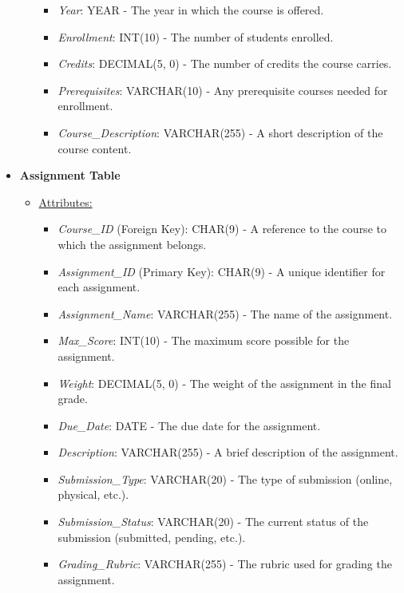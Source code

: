 \documentclass[12pt]{article}
\begin{document}
\begin{itemize}
\begin{itemize}
\begin{itemize}
            \item \textit{Year}: YEAR - The year in which the course is offered.
            \item \textit{Enrollment}: INT(10) - The number of students enrolled.
            \item \textit{Credits}: DECIMAL(5, 0) - The number of credits the course carries.
            \item \textit{Prerequisites}: VARCHAR(10) - Any prerequisite courses needed for enrollment.
            \item \textit{Course\_Description}: VARCHAR(255) - A short description of the course content.
        \end{itemize}
    \end{itemize}
    
    \item \textbf{Assignment Table}
    \begin{itemize}
        \item \underline{Attributes:}
        \begin{itemize}
            \item \textit{Course\_ID} (Foreign Key): CHAR(9) - A reference to the course to which the assignment belongs.
            \item \textit{Assignment\_ID} (Primary Key): CHAR(9) - A unique identifier for each assignment.
            \item \textit{Assignment\_Name}: VARCHAR(255) - The name of the assignment.
            \item \textit{Max\_Score}: INT(10) - The maximum score possible for the assignment.
            \item \textit{Weight}: DECIMAL(5, 0) - The weight of the assignment in the final grade.
            \item \textit{Due\_Date}: DATE - The due date for the assignment.
            \item \textit{Description}: VARCHAR(255) - A brief description of the assignment.
            \item \textit{Submission\_Type}: VARCHAR(20) - The type of submission (online, physical, etc.).
            \item \textit{Submission\_Status}: VARCHAR(20) - The current status of the submission (submitted, pending, etc.).
            \item \textit{Grading\_Rubric}: VARCHAR(255) - The rubric used for grading the assignment.
        \end{itemize}
    \end{itemize}
\pagebreak
    

\end{itemize}
\end{document}
